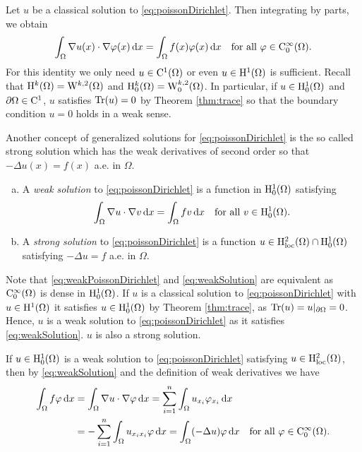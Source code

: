 Let $u$ be a classical solution to \eqref{eq:poissonDirichlet}.
Then integrating by parts, we obtain
\begin{equation}
  \label{eq:weakPoissonDirichlet}
  \int_\Omega \nabla u(x) \cdot \nabla \varphi(x) \, {\operatorname{d}\!{x}} = \int_\Omega f(x) \varphi(x) \, {\operatorname{d}\!{x}} \quad\text{for all } \varphi \in \mathrm{C}_0^\infty(\Omega).
\end{equation}
For this identity we only need $u \in \mathrm{C}^1(\Omega)$ or even $u \in \mathrm{H}^1(\Omega)$ is sufficient.
Recall that $\mathrm{H}^k(\Omega) = \mathrm{W}^{k,2}(\Omega)$ and $\mathrm{H}_0^k(\Omega) = \mathrm{W}_0^{k,2}(\Omega)$.
In particular, if $u \in \mathrm{H}_0^1(\Omega)$ and $\partial\Omega \in \mathrm{C}^1$, $u$ satisfies $\operatorname{Tr}(u) = 0$ by Theorem \ref{thm:trace} so that the boundary condition $u = 0$ holds in a weak sense.

Another concept of generalized solutions for \eqref{eq:poissonDirichlet} is the so called strong solution which has the weak derivatives of second order so that $-\Delta u(x) = f(x)$ a.e. in $\Omega$.

\begin{defn}
  \begin{enumerate}[a)]
    \item A \emph{weak solution} to \eqref{eq:poissonDirichlet} is  a function in $\mathrm{H}_0^1(\Omega)$ satisfying 
      \begin{equation}
        \label{eq:weakSolution}
        \int_\Omega \nabla u \cdot \nabla v \, {\operatorname{d}\!{x}} = \int_\Omega f v \, {\operatorname{d}\!{x}} \quad\text{for all } v \in \mathrm{H}_0^1(\Omega).
      \end{equation}
    \item A \emph{strong solution} to \eqref{eq:poissonDirichlet} is a function $u \in \mathrm{H}_{\operatorname{loc}}^2(\Omega) \cap \mathrm{H}_0^1(\Omega)$ satisfying $-\Delta u = f$ a.e. in $\Omega$.
  \end{enumerate}
\end{defn}

Note that \eqref{eq:weakPoissonDirichlet} and \eqref{eq:weakSolution} are equivalent as $\mathrm{C}_0^\infty(\Omega)$ is dense in $\mathrm{H}_0^1(\Omega)$.
If $u$ is a classical solution to \eqref{eq:poissonDirichlet} with $u \in \mathrm{H}^1(\Omega)$ it satisfies $u \in \mathrm{H}_0^1(\Omega)$ by Theorem \ref{thm:trace}, as $\operatorname{Tr}(u) = u|_{\partial\Omega} = 0$. 
Hence, $u$ is a weak solution to \eqref{eq:poissonDirichlet} as it satisfies \eqref{eq:weakSolution}.
$u$ is also a strong solution.

If $u \in \mathrm{H}_0^1(\Omega)$ is a weak solution to \eqref{eq:poissonDirichlet} satisfying $u \in \mathrm{H}_{\operatorname{loc}}^2(\Omega)$, then by \eqref{eq:weakSolution} and the definition of weak derivatives we have
\begin{align*}
\int_\Omega f \varphi \, {\operatorname{d}\!{x}}
&= \int_\Omega \nabla u \cdot \nabla \varphi \, {\operatorname{d}\!{x}}
= \sum_{i = 1}^n \int_\Omega u_{x_i} \varphi_{x_i} \, {\operatorname{d}\!{x}} \\
&= -\sum_{i = 1}^n \int_\Omega u_{x_i x_i} \varphi\, {\operatorname{d}\!{x}} 
= \int_\Omega (-\Delta u) \varphi \, {\operatorname{d}\!{x}} \quad \text{for all } \varphi \in \mathrm{C}_0^\infty(\Omega).
\end{align*}

